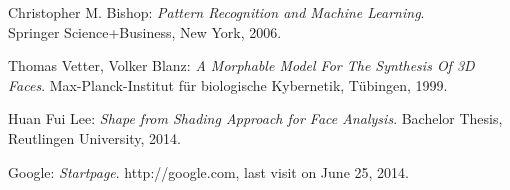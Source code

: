 \begin{thebibliography}{10}



{\sc Christopher M. Bishop}: {\em Pattern Recognition and Machine Learning}.
\\Springer Science+Business, New York, 2006.

{\sc Thomas Vetter, Volker Blanz}: {\em A Morphable Model For The Synthesis Of 3D Faces}.
Max-Planck-Institut f{\"u}r biologische Kybernetik, T{\"u}bingen, 1999.

{\sc Huan Fui Lee}: {\em Shape from Shading Approach for Face Analysis}.
Bachelor Thesis, Reutlingen University, 2014.

{\sc Google}: {\em Startpage}.
http://google.com, last visit on June 25, 2014.



\end{thebibliography}


